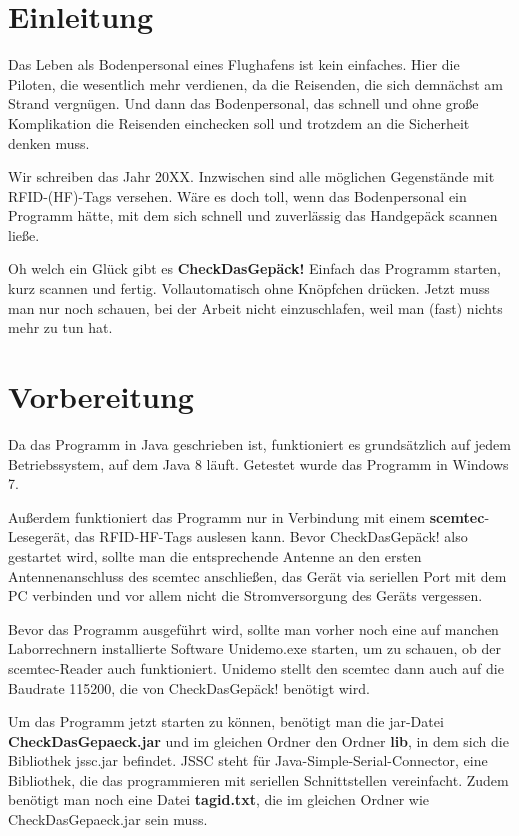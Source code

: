 \documentclass[paper=a4,fontsize=11pt,headsepline,footsepline,parskip=half]{scrartcl}
\begin{document}
\tableofcontents

\section{Einleitung}

Das Leben als Bodenpersonal eines Flughafens ist kein einfaches. Hier die Piloten, die wesentlich mehr verdienen,
da die Reisenden, die sich demnächst am Strand vergnügen. Und dann das Bodenpersonal, das schnell und ohne große
Komplikation die Reisenden einchecken soll und trotzdem an die Sicherheit denken muss.

Wir schreiben das Jahr 20XX. Inzwischen sind alle möglichen Gegenstände mit RFID-(HF)-Tags versehen. Wäre es doch
toll, wenn das Bodenpersonal ein Programm hätte, mit dem sich schnell und zuverlässig das Handgepäck scannen ließe.

Oh welch ein Glück gibt es \textbf{CheckDasGepäck!} Einfach das Programm starten, kurz scannen und fertig.
Vollautomatisch ohne Knöpfchen drücken. Jetzt muss man nur noch schauen, bei der Arbeit nicht einzuschlafen, weil
man (fast) nichts mehr zu tun hat.

\section{Vorbereitung}

Da das Programm in Java geschrieben ist, funktioniert es grundsätzlich auf jedem Betriebssystem, auf dem Java 8 läuft. Getestet wurde
das Programm in Windows 7.

Außerdem funktioniert das Programm nur in Verbindung mit einem \textbf{scemtec}-Lesegerät, das RFID-HF-Tags auslesen kann. Bevor
CheckDasGepäck! also gestartet wird, sollte man die entsprechende Antenne an den ersten Antennenanschluss des scemtec anschließen,
das Gerät via seriellen Port mit dem PC verbinden und vor allem nicht die Stromversorgung des Geräts vergessen.

Bevor das Programm ausgeführt wird, sollte man vorher noch eine auf manchen Laborrechnern installierte Software Unidemo.exe starten, um
zu schauen, ob der scemtec-Reader auch funktioniert. Unidemo stellt den scemtec dann auch auf die Baudrate 115200, die von CheckDasGepäck!
benötigt wird.

Um das Programm jetzt starten zu können, benötigt man die jar-Datei \textbf{CheckDasGepaeck.jar} und im gleichen Ordner den Ordner \textbf{lib}, 
in dem sich die Bibliothek jssc.jar befindet. JSSC steht für Java-Simple-Serial-Connector, eine Bibliothek, die das programmieren mit seriellen
Schnittstellen vereinfacht. Zudem benötigt man noch eine Datei \textbf{tagid.txt}, die im gleichen Ordner wie CheckDasGepaeck.jar sein muss.
\end{document}
